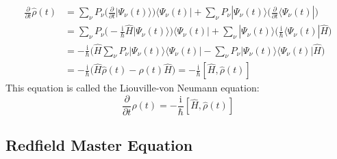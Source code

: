 \documentclass[9pt]{report}
\begin{document}
\begin{align}
\frac{\partial}{\partial t}\hat{\rho}(t) &= \sum_{\nu}P_{\nu}\Big(\frac{\partial}{\partial t}|\Psi_{\nu}(t)\rangle\Big)\langle\Psi_{\nu}(t)|+\sum_{\nu}P_{\nu}|\Psi_{\nu}(t)\rangle\Big(\frac{\partial}{\partial t}\langle\Psi_{\nu}(t)|\Big)\\
&= \sum_{\nu}P_{\nu}\Big(-\frac{\mathrm{i}}{\hbar}\hat{H}|\Psi_{\nu}(t)\rangle\Big)\langle\Psi_{\nu}(t)|+\sum_{\nu}|\Psi_{\nu}(t)\rangle\Big(\frac{\mathrm{i}}{\hbar}\langle\Psi_{\nu}(t)|\hat{H}\Big)\\
&= -\frac{\mathrm{i}}{\hbar}\Big(\hat{H}\sum_{\nu}P_{\nu}|\Psi_{\nu}(t)\rangle\langle\Psi_{\nu}(t)|-\sum_{\nu}P_{\nu}|\Psi_{\nu}(t)\rangle\langle\Psi_{\nu}(t)|\hat{H}\Big)\\
&= -\frac{\mathrm{i}}{\hbar}\big(\hat{H}\hat{\rho}(t)-\hat{\rho}(t)\hat{H}\big)=-\frac{\mathrm{i}}{\hbar}[\hat{H},\hat{\rho}(t)]
\end{align}
This equation is called the Liouville-von Neumann equation:
\begin{equation}
\frac{\partial}{\partial t}\hat{\rho}(t) = -\frac{\mathrm{i}}{\hbar}[\hat{H},\hat{\rho}(t)]
\end{equation}




\subsection{Redfield Master Equation}
\end{document}

